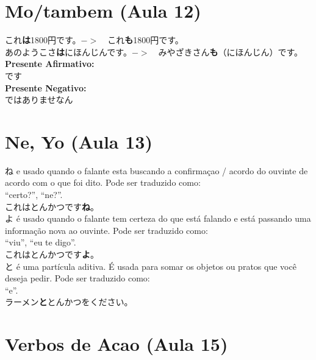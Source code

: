 \documentclass[a4paper, 12pt]{article}
\begin{document}
\section{Mo/tambem (Aula 12)}
\begin{CJK}{UTF8}{min}
	これ\textbf{は}1800円です。$ -> $　これ\textbf{も}1800円です。\\
	
	あのようこさ\textbf{は}にほんじんです。$ -> $　みやざきさん\textbf{も}（にほんじん）です。\\
	
	\textbf{Presente Afirmativo:}\\
	です\\
	
	\textbf{Presente Negativo:}\\
	ではありませなん\\
	
	
\end{CJK}

\section{Ne, Yo (Aula 13)}
\begin{CJK}{UTF8}{min}
	ね e usado quando o falante esta buscando a confirmaçao / acordo do ouvinte de acordo com	o que foi dito. Pode ser traduzido como:\\
	“certo?”, “ne?”.\\
	これはとんかつです\textbf{ね}。\\
	
	よ é usado quando o falante tem certeza do que está falando e está passando uma	informação nova ao ouvinte. Pode ser traduzido como: \\
	“viu”, “eu te digo”.\\
	これはとんかつです\textbf{よ}。\\
	
	と é uma partícula aditiva. É usada para somar	os objetos ou pratos que você deseja pedir.	Pode ser traduzido como: \\“e”.\\
	ラーメン\textbf{と}とんかつをください。\\
	
	
\end{CJK}

\section{Verbos de Acao (Aula 15)}
\end{document}

